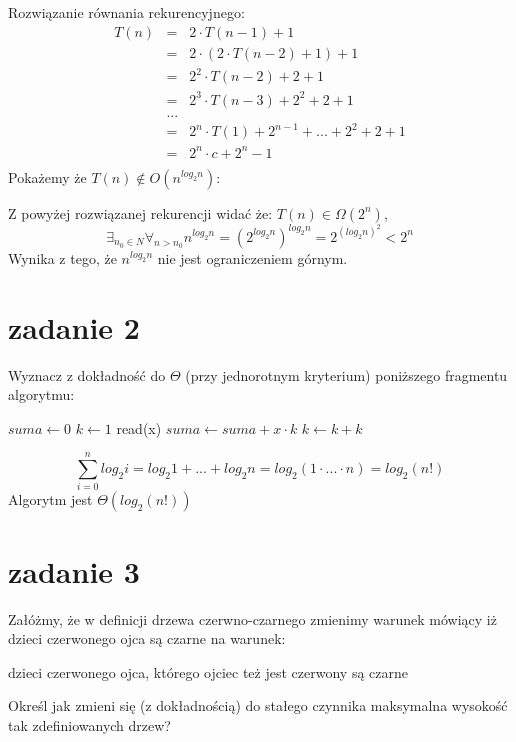 \documentclass[svgnames]{report}
\begin{document}
Rozwiązanie równania rekurencyjnego:
\begin{eqnarray*}
T(n) 	&=& 2 \cdot T(n-1) + 1	\\
		&=&	2 \cdot ( 2\cdot T(n-2) + 1 ) + 1	\\
		&=& 2^2 \cdot T(n-2) + 2 + 1	\\
		&=&	2^3 \cdot T(n-3) + 2^2 + 2 + 1 \\
		&...&	\\
		&=&	2^n\cdot T(1) + 2^{n-1} + ... + 2^2 + 2 + 1 \\
		&=& 2^n \cdot c + 2^n - 1	\\
\end{eqnarray*}
Pokażemy że $T(n) \not\in O(n^{log_2 n})$:

Z powyżej rozwiązanej rekurencji widać że: $T(n) \in \Omega (2^n)$, 
\begin{equation}
	\exists_{n_0 \in N} \forall_{n > n_0} n^{log_2 n} = \left(2^{log_2 n}\right)^{log_2 n} = 2^{(log_2 n)^2} < 2^n
\end{equation}
Wynika z tego, że $n^{log_2 n}$ nie jest ograniczeniem górnym.


\section{zadanie 2}
\begin{framed}
Wyznacz z dokładność do $\Theta$ (przy jednorotnym kryterium) poniższego fragmentu algorytmu:
\begin{algorithmic}
\STATE $suma \leftarrow 0$
	\STATE $k \leftarrow 1$
		\STATE read(x)
		\STATE $suma \leftarrow suma + x \cdot k$
		\STATE $k \leftarrow k + k$
	\ENDWHILE
\ENDFOR
\end{algorithmic}
\end{framed}

\begin{equation*}
	\sum\limits_{i=0}^{n} log_2 i = log_2 1 + ... + log_2 n = log_2(1 \cdot ... \cdot n) = log_2(n!)
\end{equation*}
Algorytm jest $\Theta(log_2(n!))$


\section{zadanie 3}
\begin{framed}
Załóżmy, że w definicji drzewa czerwno-czarnego zmienimy warunek mówiący iż dzieci czerwonego ojca są czarne na warunek:

dzieci czerwonego ojca, którego ojciec też jest czerwony są czarne

Określ jak zmieni się (z dokładnością) do stałego czynnika maksymalna wysokość tak zdefiniowanych drzew?

\end{framed}
\end{document}
